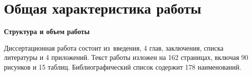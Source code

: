 
\section*{Общая характеристика работы}

\newcommand{\highlight}[1]{\textbf{#1}}
\newcommand{\actuality}{\pdfbookmark[1]{Актуальность темы исследования}{actuality}\highlight{\actualityTXT}}
\newcommand{\progress}{\pdfbookmark[1]{Степень разработанности темы исследования}{progress}\highlight{\progressTXT}}
\newcommand{\aim}{\pdfbookmark[1]{Цель диссертационный работы}{aim}\highlight{\aimTXT}}
\newcommand{\tasks}{\pdfbookmark[1]{Задачи исследования}{tasks}\highlight{\tasksTXT}}
\newcommand{\novelty}{\pdfbookmark[1]{Научная новизна}{novelty}\highlight{\noveltyTXT}}
\newcommand{\influence}{\pdfbookmark[1]{Теоретическая и практическая значимость}{influence}\highlight{\influenceTXT}}
\newcommand{\methods}{\pdfbookmark[1]{Методология и методы исследования}{methods}\highlight{\methodsTXT}}
\newcommand{\defpositions}{\pdfbookmark[1]{Положения, выносимые на защиту}{defpositions}\highlight{\defpositionsTXT}}
\newcommand{\reliability}{\pdfbookmark[1]{Степень достоверности и апробация результатов работы}{reliability}\highlight{\reliabilityTXT}}
\newcommand{\contribution}{\pdfbookmark[1]{Личный вклад автора}{contribution}\highlight{\contributionTXT}}
\newcommand{\pasport}{\pdfbookmark[1]{Соответствие паспорту заявленной специальности}{pasport}\highlight{\pasportTXT}}
\newcommand{\publications}{\pdfbookmark[1]{Публикации}{publications}\highlight{\publicationsTXT}}
\newcommand{\srtucture}{\highlight{Структура и объем работы}}



{\srtucture}

Диссертационная работа состоит из~введения, 4 глав, заключения, списка литературы и 4 приложений. Текст работы изложен на 162 страницах, включая 90 рисунков и 15 таблиц. Библиографический список содержит 178 наименований.